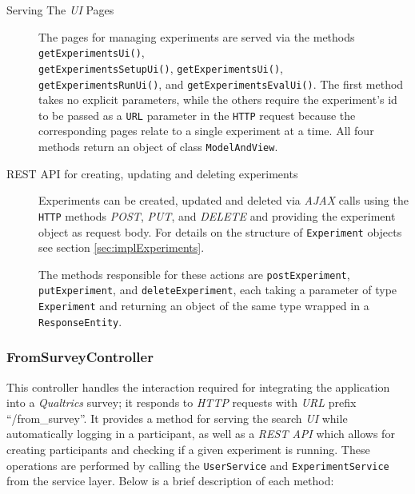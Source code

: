 \documentclass[a4paper]{usiinfbachelorproject}
\begin{document}
    \begin{description}

        \item[Serving The \emph{UI} Pages]
        The pages for managing experiments are served via the methods \texttt{getExperimentsUi()}, 
        \\ \texttt{getExperimentsSetupUi()},
        \texttt{getExperimentsUi()}, \texttt{getExperimentsRunUi()}, and \texttt{getExperimentsEvalUi()}.
        The first method takes no explicit parameters, while the others require the experiment's id to be passed as a \texttt{URL}
        parameter in the \texttt{HTTP} request because the corresponding pages relate to a single experiment at a time.
        All four methods return an object of class \texttt{ModelAndView}.

        \item[REST API for creating, updating and deleting experiments]
        Experiments can be created, updated and deleted via \emph{AJAX} calls using the \texttt{HTTP} methods
        \emph{POST}, \emph{PUT}, and \emph{DELETE} and providing the experiment object as request body. For
        details on the structure of \texttt{Experiment} objects see section \ref{sec:implExperiments}.

        The methods responsible for these actions are \texttt{postExperiment}, \texttt{putExperiment}, and
        \texttt{deleteExperiment}, each taking a parameter of type \texttt{Experiment} and returning an
        object of the same type wrapped in a \texttt{ResponseEntity}.

    \end{description}

\subsubsection{\textbf{FromSurveyController}}

This controller handles the interaction required for integrating the application into a \emph{Qualtrics} survey;
it responds to \emph{HTTP} requests with \emph{URL} prefix ``/from\_survey''.
It provides a method for serving the search \emph{UI} while automatically logging in a participant, as well as
a \emph{REST API} which allows for creating participants and checking if a given experiment is running. These
operations are performed by calling the \texttt{UserService} and \texttt{ExperimentService} from
the service layer.
Below is a brief description of each method:
\end{document}

